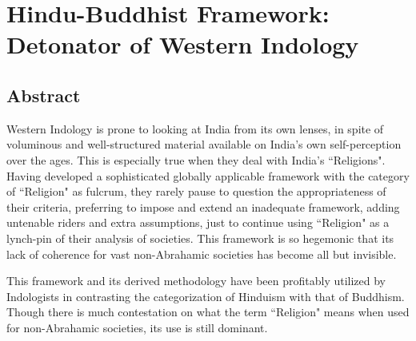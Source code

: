 
\chapter{Hindu-Buddhist Framework: Detonator of Western Indology}\label{chapter3}

\setcounter{endnote}{0}



\section*{Abstract}

Western Indology is prone to looking at India from its own lenses, in spite of voluminous and well-structured material available on India's own self-perception over the ages. This is especially true when they deal with India's ``Religions". Having developed a sophisticated globally applicable framework with the category of ``Religion" as fulcrum, they rarely pause to question the appropriateness of their criteria, preferring to impose and extend an inadequate framework, adding untenable riders and extra assumptions, just to continue using ``Religion" as a lynch-pin of their analysis of societies. This framework is so hegemonic that its lack of coherence for vast non-Abrahamic societies has become all but invisible.

This framework and its derived methodology have been profitably utilized by Indologists in contrasting the categorization of Hinduism with that of Buddhism. Though there is much contestation on what the term ``Religion" means when used for non-Abrahamic societies, its use is still dominant.

\newpage

